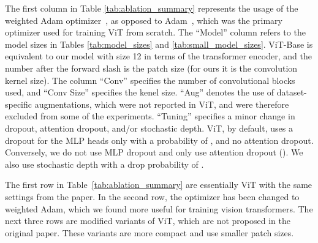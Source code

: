 \documentclass[10pt,twocolumn,letterpaper]{article}
\begin{document}
The first column in Table \ref{tab:ablation_summary} represents the usage of the weighted Adam optimizer~\cite{Zhong_2020}, as opposed to Adam~\cite{kingma2017adam}, which was the primary optimizer used for training ViT from scratch. The ``Model'' column refers to the model sizes in Tables \ref{tab:model_sizes} and \ref{tab:small_model_sizes}. ViT-Base is equivalent to our model with size 12 in terms of the transformer encoder, and the number after the forward slash is the patch size (for ours it is the convolution kernel size).
The column ``Conv'' specifies the number of convolutional blocks used, and ``Conv Size'' specifies the kenel size. 
``Aug'' denotes the use of dataset-specific augmentations, which were not reported in ViT, and were therefore excluded from some of the experiments. 
``Tuning'' specifies a minor change in dropout, attention dropout, and/or stochastic depth. 
ViT, by default, uses a dropout for the MLP heads only with a probability of , and no attention dropout. 
Conversely, we do not use MLP dropout and only use attention dropout (). 
We also use stochastic depth with a drop probability of .

The first row in Table~\ref{tab:ablation_summary} are essentially ViT with the same settings from the paper. In the second row, the optimizer has been changed to weighted Adam, which we found more useful for training vision transformers. The next three rows are modified variants of ViT, which are not proposed in the original paper. These variants are more compact and use smaller patch sizes.
\end{document}

